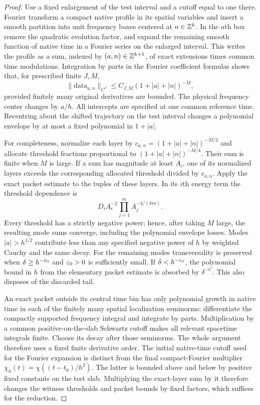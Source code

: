 \begin{proof}
Use a fixed enlargement of the test interval and a cutoff equal to one
there. Fourier transform a compact native profile in its spatial
variables and insert a smooth partition into unit frequency boxes
centered at $a\in\mathbb Z^k$. In the $a$th box remove the quadratic evolution
factor, and expand the remaining smooth function of native time in a
Fourier series on the enlarged interval. This writes the profile as a
sum, indexed by $(a,n)\in\mathbb Z^{k+1}$, of exact extensions times common
time modulations. Integration by parts in the Fourier coefficient
formulas shows that, for prescribed finite $J,M$,
\[
 \|\text{data}_{a,n}\|_{C^J}
 \le C_{J,M}(1+|a|+|n|)^{-M},
\]
provided finitely many original derivatives are bounded. The physical
frequency center changes by $a/h$. All intercepts are specified at one
common reference time. Recentring about the shifted trajectory on the
test interval changes a polynomial envelope by at most a fixed
polynomial in $1+|a|$.

For completeness, normalize each layer by
$c_{a,n}=(1+|a|+|n|)^{-M/2}$ and allocate threshold fractions proportional
to $(1+|a|+|n|)^{-M/4}$. Their sum is finite when $M$ is large. If a sum
has magnitude at least $A_i$, one of its normalized layers exceeds the
corresponding allocated threshold divided by $c_{a,n}$. Apply the exact
packet estimate to the tuples of these layers. In its $i$th energy term
the threshold dependence is
\[
 D_i A_i^{-2}\prod_{j=1}^m A_j^{-4/(km)}.
\]
Every threshold has a strictly negative power; hence, after taking $M$
large, the resulting mode sums converge, including the polynomial
envelope losses. Modes $|a|>h^{1/2}$ contribute less than any specified
negative power of $h$ by weighted Cauchy and the same decay. For the
remaining modes transversality is preserved when
$\delta\ge h^{-\varepsilon_0}$ and $\varepsilon_0>0$ is sufficiently small. If
$\delta<h^{-\varepsilon_0}$, the polynomial bound in $h$ from the elementary
packet estimate is absorbed by $\delta^{-C}$. This also disposes of
the discarded tail.

An exact packet outside its central time bin has only polynomial
growth in native time in each of the finitely many spatial localization
seminorms: differentiate the compactly supported frequency integral and
integrate by parts. Multiplication by a common positive-on-the-slab
Schwartz cutoff makes all relevant spacetime integrals finite. Choose
its decay after those seminorms. The whole argument therefore uses a
fixed finite derivative order.
The initial native-time cutoff used for the Fourier expansion is
distinct from the final compact-Fourier multiplier
$\chi_h(t)=\chi((t-t_0)/h^2)$. The latter is bounded above and below
by positive fixed constants on the test slab. Multiplying the
exact-layer sum by it therefore changes the witness thresholds and
packet bounds by fixed factors, which suffices for the reduction.
\end{proof}

